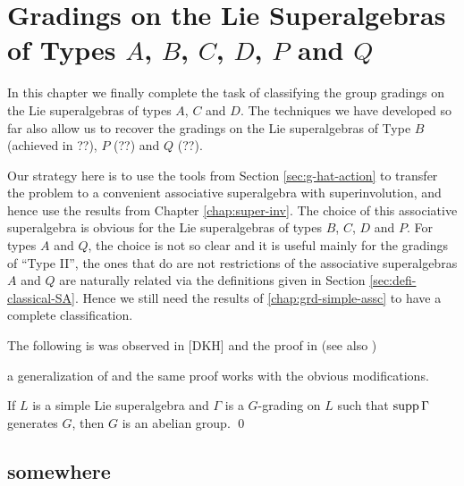 \chapter{Gradings on the Lie Superalgebras of Types \texorpdfstring{$A$, $B$, $C$, $D$, $P$ and $Q$}{A, B, C, D, P and Q}}\label{chap:Lie}


In this chapter we finally complete the task of classifying the group gradings on the Lie superalgebras of types $A$, $C$ and $D$.
The techniques we have developed so far also allow us to recover the gradings on the Lie superalgebras of Type $B$ (achieved in ??), $P$ (??) and $Q$ (??).

Our strategy here is to use the tools from Section \ref{sec:g-hat-action} to transfer the problem to a convenient associative superalgebra with superinvolution, and hence use the results from Chapter \ref{chap:super-inv}.
The choice of this associative superalgebra is obvious for the Lie superalgebras of types $B$, $C$, $D$ and $P$.
For types $A$ and $Q$, the choice is not so clear and it is useful mainly for the gradings of ``Type II'', the ones that do are not restrictions of the associative superalgebras $A$ and $Q$ are naturally related via the definitions given in Section \ref{sec:defi-classical-SA}.
Hence we still need the results of \cref{chap:grd-simple-assc} to have a complete classification.

The following is was observed in [DKH] and the proof in \cite[Lemma 2.1]{BZ06} (see also  \cite[Proposition 1.12]{livromicha})

a generalization of \cite[Proposition 1.12]{livromicha} and the same proof works with the obvious modifications.

\begin{prop}\label{prop:simple-Lie-G-abelian}
    If $L$ is a simple Lie superalgebra and $\Gamma$ is a $G$-grading on $L$ such that $\operatorname{supp} \Gamma$ generates $G$, then $G$ is an abelian group. \qed
\end{prop}


\section{somewhere}

